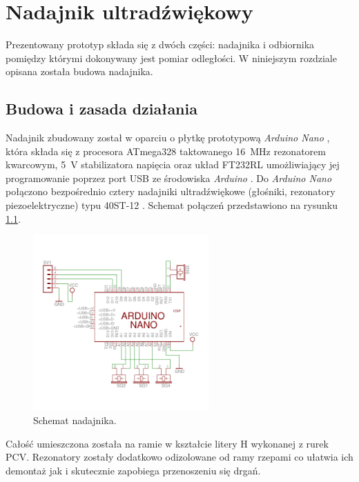 \chapter{Nadajnik ultradźwiękowy}

Prezentowany prototyp składa się z dwóch części: nadajnika i odbiornika pomiędzy którymi
dokonywany jest pomiar odległości. W niniejszym rozdziale opisana została budowa nadajnika. 

\section{Budowa i zasada działania}

Nadajnik zbudowany został w oparciu o płytkę prototypową \textit{Arduino Nano} \cite{bib:arduinoNano},
która składa się z procesora ATmega328 \cite{bib:atmega328} taktowanego \SI{16}{MHz} rezonatorem kwarcowym,
\SI{5}{V} stabilizatora napięcia oraz układ FT232RL umożliwiający 
jej programowanie poprzez port USB ze środowiska \textit{Arduino} \cite{bib:Arduino}. 
Do \textit{Arduino Nano} połączono 
bezpośrednio cztery nadajniki ultradźwiękowe (głośniki, rezonatory piezoelektryczne) typu 40ST-12 \cite{bib:40ST12}.
Schemat połączeń przedstawiono na rysunku \ref{fig:nadajnik_schemat}.

 \begin{figure}[ht!]
    \centering
    \includegraphics[width=0.6\textwidth, trim= 0mm 0mm 0mm 0mm,clip]{transmitter}
    \caption{Schemat nadajnika.}
    \label{fig:nadajnik_schemat}
\end{figure}

Całość umieszczona została na ramie w kształcie litery H wykonanej z rurek PCV.
Rezonatory zostały dodatkowo odizolowane od ramy rzepami co ułatwia ich demontaż jak i skutecznie
zapobiega przenoszeniu się drgań. 

